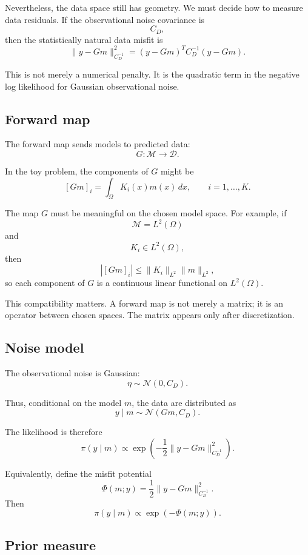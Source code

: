 \documentclass[11pt,a4paper]{book}
\newcommand{\M}{\mathcal{M}}      %
\newcommand{\D}{\mathcal{D}}      %
\newcommand{\noise}{\eta}
\newcommand{\obs}{y}
\newcommand{\G}{G}
\begin{document}
Nevertheless, the data space still has geometry. We must decide how to measure
data residuals. If the observational noise covariance is
\[
    C_D,
\]
then the statistically natural data misfit is
\[
    \|\obs-\G m\|_{C_D^{-1}}^2
    =
    (\obs-\G m)^T C_D^{-1}(\obs-\G m).
\]

This is not merely a numerical penalty. It is the quadratic term in the
negative log likelihood for Gaussian observational noise.

\subsection{Forward map}

The forward map sends models to predicted data:
\[
    \G : \M \to \D.
\]

In the toy problem, the components of $\G$ might be
\[
    [\G m]_i
    =
    \int_\Omega K_i(x)m(x)\,dx,
    \qquad
    i=1,\ldots,K.
\]

The map $\G$ must be meaningful on the chosen model space. For example, if
\[
    \M=L^2(\Omega)
\]
and
\[
    K_i\in L^2(\Omega),
\]
then
\[
    |[\G m]_i|
    \leq
    \|K_i\|_{L^2}\|m\|_{L^2},
\]
so each component of $\G$ is a continuous linear functional on $L^2(\Omega)$.

This compatibility matters. A forward map is not merely a matrix; it is an
operator between chosen spaces. The matrix appears only after discretization.

\subsection{Noise model}

The observational noise is Gaussian:
\[
    \noise \sim \mathcal{N}(0,C_D).
\]

Thus, conditional on the model $m$, the data are distributed as
\[
    \obs\mid m
    \sim
    \mathcal{N}(\G m,C_D).
\]

The likelihood is therefore
\[
    \pi(\obs\mid m)
    \propto
    \exp
    \left(
        -
        \frac{1}{2}
        \|\obs-\G m\|_{C_D^{-1}}^2
    \right).
\]

Equivalently, define the misfit potential
\[
    \Phi(m;\obs)
    =
    \frac{1}{2}
    \|\obs-\G m\|_{C_D^{-1}}^2.
\]
Then
\[
    \pi(\obs\mid m)
    \propto
    \exp(-\Phi(m;\obs)).
\]

\subsection{Prior measure}
\end{document}

